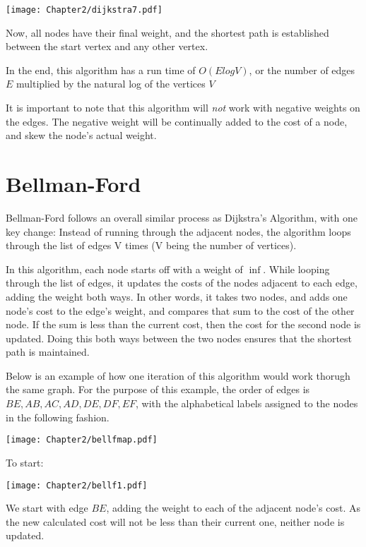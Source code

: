 \begin{center}
\texttt{[image: Chapter2/dijkstra7.pdf]}
\end{center}
Now, all nodes have their final weight, and the shortest path is established between the start vertex and any other vertex.

In the end, this algorithm has a run time of $O(E log V)$, or the number of edges $E$ multiplied by the natural log of the vertices $V$

It is important to note that this algorithm will \emph{not} work with negative weights on the edges. The negative weight will be continually added to the cost of a node, and skew the node's actual weight.


\section{Bellman-Ford}

Bellman-Ford follows an overall similar process as Dijkstra's Algorithm, with one key change: Instead of running through the adjacent nodes, the algorithm loops through the list of edges V times (V being the number of vertices). 

In this algorithm, each node starts off with a weight of $\inf$. While looping through the list of edges, it updates the costs of the nodes adjacent to each edge, adding the weight both ways. In other words, it takes two nodes, and adds one node's cost to the edge's weight, and compares that sum to the cost of the other node. If the sum is less than the current cost, then the cost for the second node is updated. Doing this both ways between the two nodes ensures that the shortest path is maintained.

Below is an example of how one iteration of this algorithm would work thorugh the same graph. For the purpose of this example, the order of edges is $BE, AB, AC, AD, DE, DF, EF$, with the alphabetical labels assigned to the nodes in the following fashion.


\begin{center}
\texttt{[image: Chapter2/bellfmap.pdf]}
\end{center}

To start:

\begin{center}
\texttt{[image: Chapter2/bellf1.pdf]}
\end{center}
We start with edge $BE$, adding the weight to each of the adjacent node's cost. As the new calculated cost will not be less than their current one, neither node is updated.


